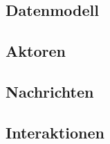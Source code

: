 

\subsection{Datenmodell}\label{sec:dat_model}


\subsection{Aktoren}\label{sec:actors}


\subsection{Nachrichten}\label{sec:messages}


\subsection{Interaktionen}\label{sec:interactions}


